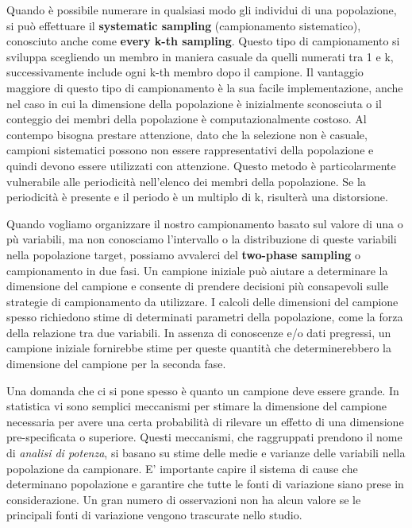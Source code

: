 \documentclass[a4paper]{extarticle}
\begin{document}
Quando è possibile numerare in qualsiasi modo gli individui di una popolazione, si può effettuare il \textbf{systematic sampling} (campionamento sistematico), conosciuto anche come \textbf{every k-th sampling}. Questo tipo di campionamento si sviluppa scegliendo un membro in maniera casuale da quelli numerati tra 1 e k, successivamente include ogni k-th membro dopo il campione.  Il vantaggio maggiore di questo tipo di campionamento è la sua facile implementazione, anche nel caso in cui la dimensione della popolazione è inizialmente sconosciuta o il conteggio dei membri della popolazione è computazionalmente costoso. Al contempo bisogna prestare attenzione, dato che la selezione non è casuale, campioni sistematici possono non essere rappresentativi della popolazione e quindi devono essere utilizzati con attenzione. Questo metodo è particolarmente vulnerabile alle periodicità nell'elenco dei membri della popolazione. Se la periodicità è presente e il periodo è un multiplo di k, risulterà una distorsione.

Quando vogliamo organizzare il nostro campionamento basato sul valore di una o pù variabili, ma non conosciamo l'intervallo o la distribuzione di queste variabili nella popolazione target, possiamo avvalerci del \textbf{two-phase sampling} o campionamento in due fasi. Un campione iniziale può aiutare a determinare la dimensione del campione e consente di  prendere decisioni più consapevoli sulle strategie di campionamento da utilizzare. I calcoli delle dimensioni del campione spesso richiedono stime di determinati parametri della popolazione, come la forza della relazione tra due variabili. In assenza di conoscenze e/o dati pregressi, un campione iniziale fornirebbe stime per queste quantità che determinerebbero la dimensione del campione per la seconda fase.

Una domanda che ci si pone spesso è quanto un campione deve essere grande. In statistica vi sono semplici meccanismi per stimare la dimensione del campione necessaria per avere una certa probabilità di rilevare un effetto di una dimensione pre-specificata o superiore. Questi meccanismi, che raggruppati prendono il nome di \textit{analisi di potenza}, si basano su stime delle medie e varianze delle variabili nella popolazione da campionare. E' importante capire il sistema di cause che determinano popolazione e garantire che tutte le fonti di variazione siano prese in considerazione. Un gran numero di osservazioni non ha alcun valore se le principali fonti di variazione vengono trascurate nello studio.
\end{document}
